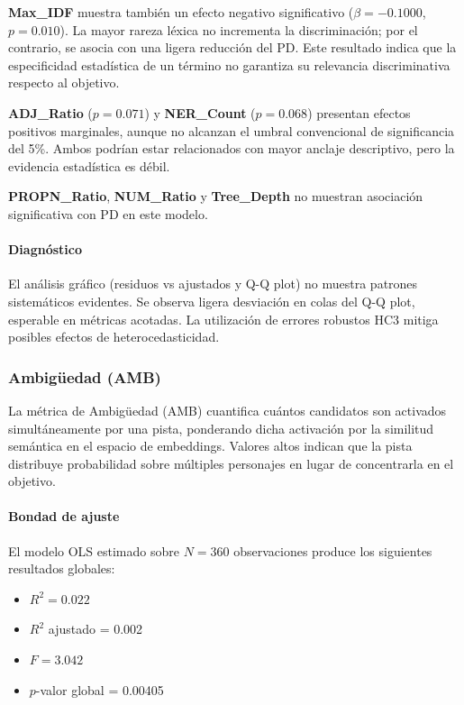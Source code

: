 \documentclass[../main.tex]{subfiles}
\begin{document}
\textbf{Max\_IDF} muestra también un efecto negativo significativo ($\beta = -0.1000$, $p = 0.010$). La mayor rareza léxica no incrementa la discriminación; por el contrario, se asocia con una ligera reducción del PD. Este resultado indica que la especificidad estadística de un término no garantiza su relevancia discriminativa respecto al objetivo.

\textbf{ADJ\_Ratio} ($p = 0.071$) y \textbf{NER\_Count} ($p = 0.068$) presentan efectos positivos marginales, aunque no alcanzan el umbral convencional de significancia del 5\%. Ambos podrían estar relacionados con mayor anclaje descriptivo, pero la evidencia estadística es débil.

\textbf{PROPN\_Ratio}, \textbf{NUM\_Ratio} y \textbf{Tree\_Depth} no muestran asociación significativa con PD en este modelo.

\paragraph{Diagnóstico}

El análisis gráfico (residuos vs ajustados y Q-Q plot) no muestra patrones sistemáticos evidentes. Se observa ligera desviación en colas del Q-Q plot, esperable en métricas acotadas. La utilización de errores robustos HC3 mitiga posibles efectos de heterocedasticidad.

\subsubsection{Ambigüedad (AMB)}

La métrica de Ambigüedad (AMB) cuantifica cuántos candidatos son activados simultáneamente por una pista, ponderando dicha activación por la similitud semántica en el espacio de embeddings. Valores altos indican que la pista distribuye probabilidad sobre múltiples personajes en lugar de concentrarla en el objetivo.

\paragraph{Bondad de ajuste}

El modelo OLS estimado sobre $N = 360$ observaciones produce los siguientes resultados globales:

\begin{itemize}
\item $R^2 = 0.022$
\item $R^2$ ajustado = 0.002
\item $F = 3.042$
\item $p$-valor global = 0.00405
\end{itemize}
\end{document}

